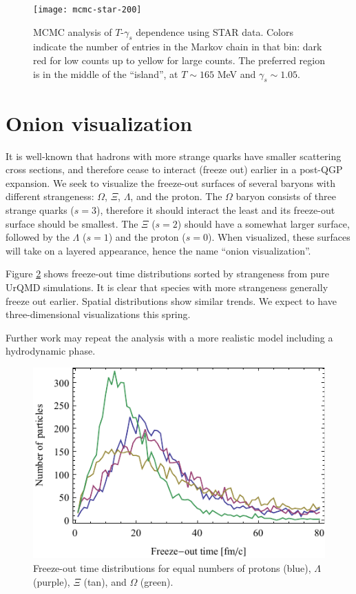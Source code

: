 \documentclass[twocolumn,10pt,amsmath]{revtex4-1}
\begin{document}
\begin{figure}[t]
  \centering
  \texttt{[image: mcmc-star-200]}
  \caption{MCMC analysis of $T$-$\gamma_s$ dependence using STAR data.  Colors indicate the number of entries in the Markov chain in that bin:  dark red for low
  counts up to yellow for large counts.  The preferred region is in the middle of the ``island'', at $T \sim 165$ MeV and $\gamma_s \sim 1.05$.}
  \label{fig:mcmc}
\end{figure}





\section{Onion visualization}

It is well-known that hadrons with more strange quarks have smaller scattering cross sections, and therefore cease to interact (freeze out) earlier in a post-QGP expansion.  We
seek to visualize the freeze-out surfaces of several baryons with different strangeness:  $\Omega$, $\Xi$, $\Lambda$, and the proton.  The $\Omega$ baryon
consists of three strange quarks ($s=3$), therefore it should interact the least and its freeze-out surface should be smallest.  The $\Xi$ ($s=2$)
should have a somewhat larger surface, followed by the $\Lambda$ ($s=1$) and the proton ($s=0$).  When visualized, these surfaces will take on a layered
appearance, hence the name ``onion visualization''.

Figure \ref{fig:onion} shows freeze-out time distributions sorted by strangeness from pure UrQMD simulations.  It is clear that species with more strangeness
generally freeze out earlier.  Spatial distributions show similar trends.  We expect to have three-dimensional visualizations this spring.

Further work may repeat the analysis with a more realistic model including a hydrodynamic phase.

\begin{figure}[t]
  \centering
  \includegraphics{onion}
  \caption{Freeze-out time distributions for equal numbers of protons (blue), $\Lambda$ (purple), $\Xi$ (tan), and $\Omega$ (green).}
  \label{fig:onion}
\end{figure}
\end{document}
